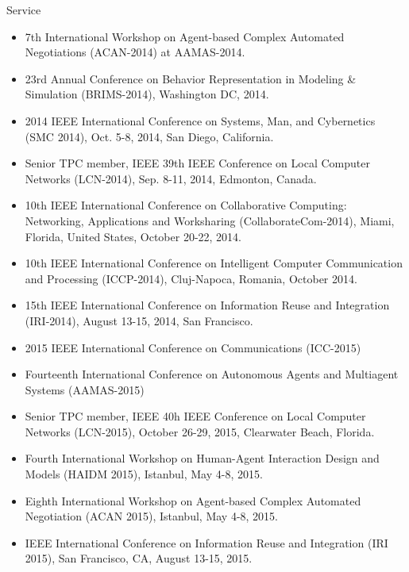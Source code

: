 \begin{category}{Service}
\begin{itemize}
\item 7th International Workshop on Agent-based Complex Automated Negotiations (ACAN-2014) at AAMAS-2014.

\item 23rd Annual Conference on Behavior Representation in Modeling \& Simulation (BRIMS-2014), Washington DC, 2014.

\item 2014 IEEE International Conference on Systems, Man, and Cybernetics (SMC 2014),  Oct. 5-8, 2014, San Diego, California.

\item Senior TPC member, IEEE 39th IEEE Conference on Local Computer Networks (LCN-2014), Sep. 8-11, 2014, Edmonton, Canada.

\item 10th IEEE International Conference on Collaborative Computing: Networking, Applications and Worksharing (CollaborateCom-2014), Miami, Florida, United States, October 20-22, 2014.

\item 10th IEEE International Conference on
Intelligent Computer Communication and Processing (ICCP-2014), Cluj-Napoca, Romania, October 2014.

\item 15th IEEE International Conference on Information Reuse and Integration (IRI-2014), August 13-15, 2014, San Francisco.

\item 2015 IEEE International Conference on Communications (ICC-2015)

\item Fourteenth International Conference on Autonomous Agents and Multiagent Systems (AAMAS-2015)

\item Senior TPC member, IEEE 40h IEEE Conference on Local Computer Networks (LCN-2015), October 26-29, 2015, Clearwater Beach, Florida.

\item Fourth International Workshop on Human-Agent Interaction Design and Models (HAIDM 2015), Istanbul, May 4-8, 2015.

\item Eighth International Workshop on Agent-based Complex Automated Negotiation (ACAN 2015), Istanbul, May 4-8, 2015.

\item IEEE International Conference on Information Reuse and Integration (IRI 2015), San Francisco, CA, August 13-15, 2015.


\end{itemize}
\end{category}
